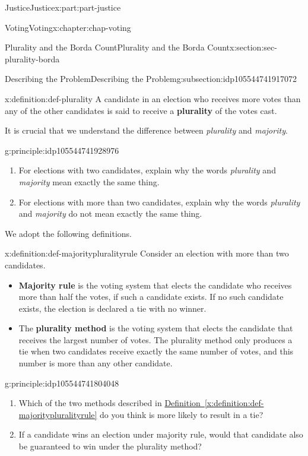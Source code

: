 \documentclass[oneside,10pt,]{book}
\newcommand{\xreffont}{\relax}
\newcommand{\terminology}[1]{\textbf{#1}}
\numberwithin{equation}{section}
\begin{document}
\begin{partptx}{Justice}{}{Justice}{}{}{x:part:part-justice}
\begin{chapterptx}{Voting}{}{Voting}{}{}{x:chapter:chap-voting}
\begin{sectionptx}{Plurality and the Borda Count}{}{Plurality and the Borda Count}{}{}{x:section:sec-plurality-borda}
\begin{subsectionptx}{Describing the Problem}{}{Describing the Problem}{}{}{g:subsection:idp105544741917072}
\begin{definition}{}{x:definition:def-plurality}%
%
A candidate in an election who receives more votes than any of the other candidates is said to receive a \terminology{plurality} of the votes cast.%
\end{definition}
It is crucial that we understand the difference between \emph{plurality} and \emph{majority}.%
\begin{principle}{}{}{g:principle:idp105544741928976}%
%
\begin{enumerate}
\item{}For elections with two candidates, explain why the words \emph{plurality} and \emph{majority} mean exactly the same thing.%
\item{}For elections with more than two candidates, explain why the words \emph{plurality} and \emph{majority} do not mean exactly the same thing.%
\end{enumerate}
\end{principle}
We adopt the following definitions.%
\begin{definition}{}{x:definition:def-majoritypluralityrule}%
%
%
%
Consider an election with more than two candidates.%
%
\begin{itemize}[label=\textbullet]
\item{}\terminology{Majority rule} is the voting system that elects the candidate who receives more than half the votes, if such a candidate exists. If no such candidate exists, the election is declared a tie with no winner.%
\item{}The \terminology{plurality method} is the voting system that elects the candidate that receives the largest number of votes. The plurality method only produces a tie when two candidates receive exactly the same number of votes, and this number is more than any other candidate.%
\end{itemize}
\end{definition}
\begin{principle}{}{}{g:principle:idp105544741804048}%
%
\begin{enumerate}
\item{}Which of the two methods described in \hyperref[x:definition:def-majoritypluralityrule]{Definition~{\xreffont\ref{x:definition:def-majoritypluralityrule}}} do you think is more likely to result in a tie?%
\item{}If a candidate wins an election under majority rule, would that candidate also be guaranteed to win under the plurality method?%

\end{enumerate}
\end{principle}
\end{subsectionptx}
\end{sectionptx}
\end{chapterptx}
\end{partptx}
\end{document}
